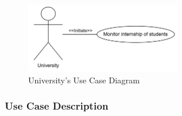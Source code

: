 \begin{figure}[H]
    \centering
    \includegraphics[width=0.6\textwidth]{Images/Use_Case_Diagrams/University_diagram.png}
    \caption{University's Use Case Diagram}
\end{figure}


\subsubsection{Use Case Description}
